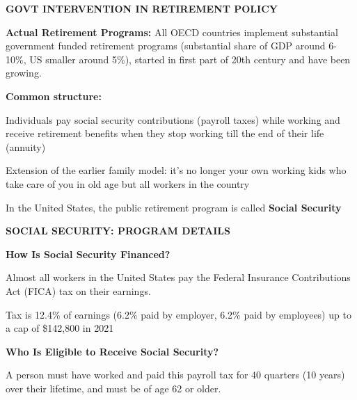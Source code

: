 \documentclass[landscape]{slides}
\begin{document}
%

\begin{slide}

\end{slide}

\begin{slide}

\end{slide}

\begin{slide}
\begin{center}
{\bf GOVT INTERVENTION IN RETIREMENT POLICY}
\end{center}

{\bf Actual Retirement Programs:} All OECD countries implement
substantial government funded retirement programs (substantial share of GDP around
6-10\%, US smaller around 5\%), started in first part of 20th
century and have been growing. 

\textbf{Common structure:}

Individuals pay social security contributions (payroll taxes) while
working and receive retirement benefits when they stop working
till the end of their life (annuity)

Extension of the earlier family model: it's no longer your own working
kids who take care of you in old age but all workers in the country

In the United States, the public retirement program is called
\textbf{Social Security}

\end{slide}

\begin{slide}

\end{slide}


\begin{slide}
\begin{center}
{\bf SOCIAL SECURITY: PROGRAM DETAILS}
\end{center}

{\bf How Is Social Security Financed?}

Almost all workers in the United States pay the Federal Insurance Contributions Act (FICA) tax on their earnings.

Tax is 12.4\% of earnings (6.2\% paid by employer, 6.2\% paid by employees) up to a cap of \$142,800 in 2021

{\bf Who Is Eligible to Receive Social Security?}

A person must have worked and paid this payroll tax for 40 quarters (10 years) over their lifetime, and must be of age 62 or older.
\end{slide}
\end{document}
